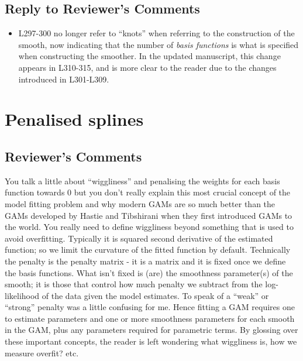 \documentclass[
]{article}
\providecommand{\tightlist}{%
  \setlength{\itemsep}{0pt}\setlength{\parskip}{0pt}}
\begin{document}
\hypertarget{section-5}{%
\subsection{\texorpdfstring{\textcolor{reviewersblue} {Reply to Reviewer's Comments}}{}}\label{section-5}}

\begin{itemize}
\tightlist
\item
  L297-300 no longer refer to ``knots'' when referring to the construction of the smooth, now indicating that the number of \emph{basis functions} is what is specified when constructing the smoother. In the updated manuscript, this change appears in L310-315, and is more clear to the reader due to the changes introduced in L301-L309.
\end{itemize}

\hypertarget{penalised-splines}{%
\section{Penalised splines}\label{penalised-splines}}

\hypertarget{reviewers-comments-5}{%
\subsection{Reviewer's Comments}\label{reviewers-comments-5}}

You talk a little about ``wiggliness'' and penalising the weights for each basis function towards 0 but you don't really explain this most crucial concept of the model fitting problem and why modern GAMs are so much better than the
GAMs developed by Hastie and Tibshirani when they first introduced GAMs to the world.
You really need to define wiggliness beyond something that is used to avoid overfitting. Typically it is squared second derivative of the estimated function; so we limit the curvature of the fitted function by default. Technically the penalty is the penalty matrix - it is a matrix and it is fixed once we define the basis functions. What isn't fixed is (are) the smoothness parameter(s) of the smooth; it is those that control how much penalty we subtract from the log-likelihood of the data given the model estimates. To speak of a ``weak'' or ``strong'' penalty was a little confusing for me.
Hence fitting a GAM requires one to estimate parameters and one or more smoothness parameters for each smooth in the GAM, plus any parameters required for parametric terms.
By glossing over these important concepts, the reader is left wondering what wiggliness is, how we measure overfit? etc.
\end{document}
